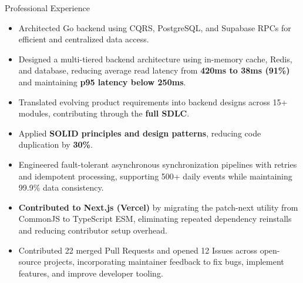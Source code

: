\documentclass{resume}
\begin{document}
\begin{experienceSection}{Professional Experience}

    \experienceItem[
        company={\textbf{Aarogya Kaya | SDE Intern | Remote}},
        location={},
        position={},
        duration={July 2025 - Jan 2026}
    ]

    \begin{itemize}
        \itemsep -6pt {}

        \item Architected Go backend using CQRS, PostgreSQL, and Supabase RPCs for efficient and centralized data access.

        \item Designed a multi-tiered backend architecture using in-memory cache, Redis, and database, reducing average read latency from \textbf{420ms to 38ms (91\%)} and maintaining \textbf{p95 latency below 250ms}.

        \item Translated evolving product requirements into backend designs across 15+ modules, contributing through the \textbf{full SDLC}.

        \item Applied \textbf{SOLID principles and design patterns}, reducing code duplication by \textbf{30\%}.

        \item Engineered fault-tolerant asynchronous synchronization pipelines with retries and idempotent processing, supporting 500+ daily events while maintaining 99.9\% data consistency.

    \end{itemize}


    \experienceItem[
        company={\textbf{Open Source Contributor | Remote}},
        location={},
        position={},
        duration={July 2025 - May 2026}
    ]

    \begin{itemize}
        \itemsep -6pt {}

        \item \textbf{Contributed to Next.js (Vercel)} by migrating the patch-next utility from CommonJS to TypeScript ESM, eliminating repeated dependency reinstalls and reducing contributor setup overhead.

        \item Contributed 22 merged Pull Requests and opened 12 Issues across open-source projects, incorporating maintainer feedback to fix bugs, implement features, and improve developer tooling.

    \end{itemize}

\end{experienceSection}
\end{document}
